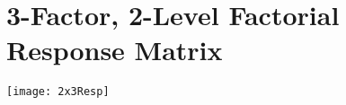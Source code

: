 \chapter{3-Factor, 2-Level Factorial Response Matrix}
\begin{center}
\texttt{[image: 2x3Resp]}
\end{center}